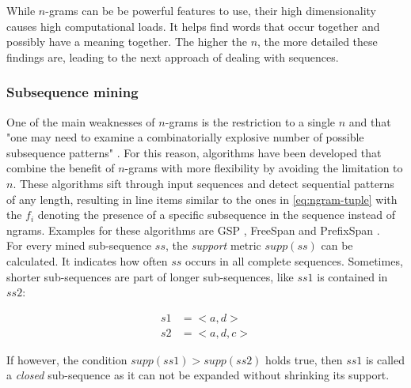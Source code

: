 While $n$-grams can be be powerful features to use, their high dimensionality causes high computational loads. It helps find words that occur together and possibly have a meaning together. The higher the $n$, the more detailed these findings are, leading to the next approach of dealing with sequences.

\subsubsection*{Subsequence mining}
One of the main weaknesses of $n$-grams is the restriction to a single $n$ and that "one may need to examine a combinatorially explosive
number of possible subsequence patterns" \cite{pei2001prefixspan}. For this reason, algorithms have been developed that combine the benefit of $n$-grams with more flexibility by avoiding the limitation to $n$. These algorithms sift through input sequences and detect sequential patterns of any length, resulting in line items similar to the ones in \autoref{eq:ngram-tuple} with the $f_i$ denoting the presence of a specific subsequence in the sequence instead of ngrams. Examples for these algorithms are GSP \cite{srikant1996gsp}, FreeSpan \cite{han2000freespan} and PrefixSpan \cite{pei2001prefixspan}.\\

For every mined sub-sequence $ss$, the \textit{support} metric $supp(ss)$ can be calculated. It indicates how often $ss$ occurs in all complete sequences. Sometimes, shorter sub-sequences are part of longer sub-sequences, like $ss1$ is contained in $ss2$:

\begin{equation*}
\begin{split}
s1 &= <a,d>\\
s2 &= <a,d,c>
\end{split}
\end{equation*}

If however, the condition $supp(ss1)>supp(ss2)$ holds true, then $ss1$ is called a \textit{closed} sub-sequence as it can not be expanded without shrinking its support.